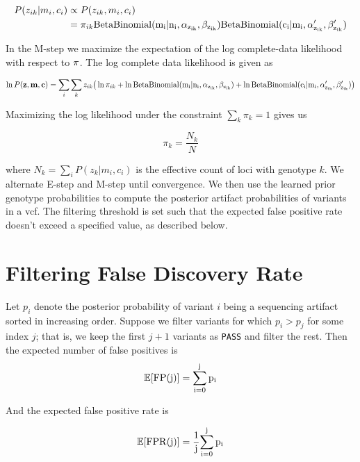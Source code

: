 \documentclass[nofootinbib,amssymb,amsmath]{revtex4}
\newcommand{\vc}{{\bf c}}
\newcommand{\vz}{{\bf z}}
\newcommand{\vm}{{\bf m}}
\newcommand{\vpi}{{\bf \pi}}
\newcommand{\code}[1]{\texttt{#1}}
\begin{document}
\begin{align}
P(z_{ik} | m_i, c_i) &\propto P(z_{ik}, m_i, c_i) \\
			&= \pi_{ik} \rm{BetaBinomial}(m_i | n_i, \alpha_{z_{ik}}, \beta_{z_{ik}})  \rm{BetaBinomial}( c_i | m_i, \alpha'_{z_{ik}}, \beta'_{z_{ik}})
\end{align}

In the M-step we maximize the expectation of the log complete-data likelihood with respect to $\vpi$. The log complete data likelihood is given as

\begin{equation}
\ln P(\vz, \vm, \vc) = \sum_i \sum_k z_{ik} \big( \ln \pi_{ik} + \ln \rm{BetaBinomial}(m_i | n_i, \alpha_{z_{ik}}, \beta_{z_{ik}})  + \ln \rm{BetaBinomial}( c_i | m_i, \alpha'_{z_{ik}}, \beta'_{z_{ik}}) \big)
\end{equation}

Maximizing the log likelihood under the constraint $\sum_k \pi_k = 1$ gives us

\begin{equation}
\pi_k = \frac{N_k}{N}
\end{equation}

where $N_k = \sum_i P(z_k | m_i, c_i)$ is the effective count of loci with genotype $k$. We alternate E-step and M-step until convergence. We then use the learned prior genotype probabilities to compute the posterior artifact probabilities of variants in a vcf. The filtering threshold is set such that the expected false positive rate doesn't exceed a specified value, as described below.

\section{Filtering False Discovery Rate}

Let $p_i$ denote the posterior probability of variant $i$ being a sequencing artifact sorted in increasing order. Suppose we filter variants for which $p_i > p_j$ for some index $j$; that is, we keep the first $j + 1$ variants as \code{PASS} and filter the rest. Then the expected number of false positives is
\begin{equation}
\mathbb{E} [ \rm{FP}(j)] = \sum_{i = 0}^{j} p_i
\end{equation}

And the expected false positive rate is

\begin{equation} \label{eq:fpr}
\mathbb{E} [ \rm{FPR}(j)]= \frac{1}{j} {\sum_{i = 0}^{j} p_i}
\end{equation}
\end{document}
